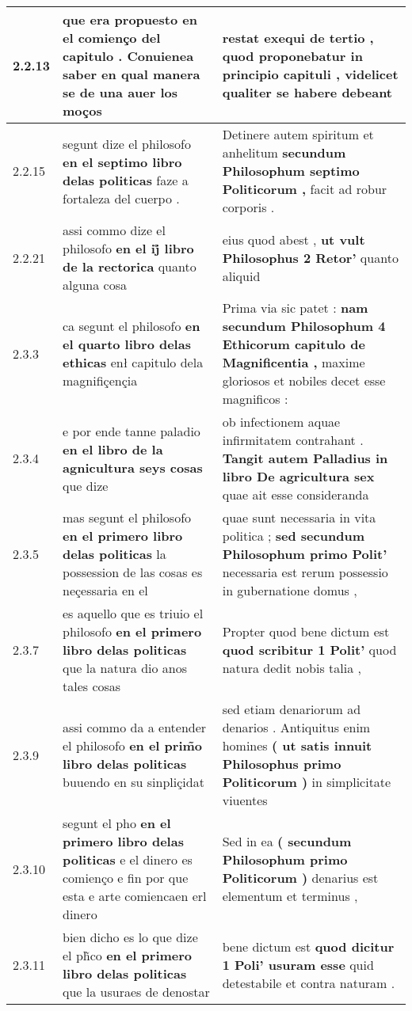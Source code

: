 \begin{tabular}{|p{1cm}|p{6.5cm}|p{6.5cm}|}
2.2.13 & que era propuesto \textbf{ en el comienço del capitulo . } Conuienea saber en qual manera se de una auer los moços & restat exequi de tertio , \textbf{ quod proponebatur in principio capituli , } videlicet qualiter se habere debeant \\\hline
2.2.15 & segunt dize el philosofo \textbf{ en el septimo libro delas politicas } faze a fortaleza del cuerpo . & Detinere autem spiritum et anhelitum \textbf{ secundum Philosophum septimo Politicorum , } facit ad robur corporis . \\\hline
2.2.21 & assi commo dize el philosofo \textbf{ en el ij̊ libro de la rectorica } quanto alguna cosa & eius quod abest , \textbf{ ut vult Philosophus 2 Retor’ } quanto aliquid \\\hline
2.3.3 & ca segunt el philosofo \textbf{ en el quarto libro delas ethicas } enł capitulo dela magnifiçençia & Prima via sic patet : \textbf{ nam secundum Philosophum 4 Ethicorum capitulo de Magnificentia , } maxime gloriosos et nobiles decet esse magnificos : \\\hline
2.3.4 & e por ende tanne paladio \textbf{ en el libro de la agnicultura seys cosas } que dize & ob infectionem aquae infirmitatem contrahant . \textbf{ Tangit autem Palladius in libro De agricultura sex } quae ait esse consideranda \\\hline
2.3.5 & mas segunt el philosofo \textbf{ en el primero libro delas politicas } la possession de las cosas es neçessaria en el & quae sunt necessaria in vita politica ; \textbf{ sed secundum Philosophum primo Polit’ } necessaria est rerum possessio in gubernatione domus , \\\hline
2.3.7 & es aquello que es triuio el philosofo \textbf{ en el primero libro delas politicas } que la natura dio anos tales cosas & Propter quod bene dictum est \textbf{ quod scribitur 1 Polit’ } quod natura dedit nobis talia , \\\hline
2.3.9 & assi commo da a entender el philosofo \textbf{ en el prim̃o libro delas politicas } buuendo en su sinpliçidat & sed etiam denariorum ad denarios . Antiquitus enim homines \textbf{ ( ut satis innuit Philosophus primo Politicorum ) } in simplicitate viuentes \\\hline
2.3.10 & segunt el pho \textbf{ en el primero libro delas politicas } e el dinero es comienço e fin por que esta e arte comiencaen erl dinero & Sed in ea \textbf{ ( secundum Philosophum primo Politicorum ) } denarius est elementum et terminus , \\\hline
2.3.11 & bien dicho es lo que dize el ph̃co \textbf{ en el primero libro delas politicas } que la usuraes de denostar & bene dictum est \textbf{ quod dicitur 1 Poli’ usuram esse } quid detestabile et contra naturam . \\\hline

\end{tabular}
